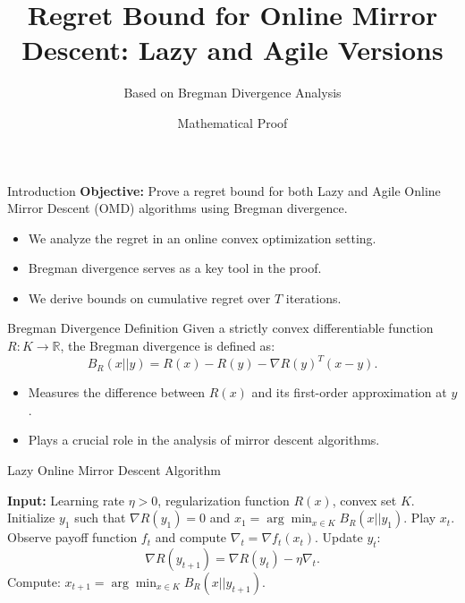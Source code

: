 \documentclass{beamer}
\title{Regret Bound for Online Mirror Descent: Lazy and Agile Versions}
\author{Based on Bregman Divergence Analysis}
\date{Mathematical Proof}
\begin{document}
\frame{\titlepage}

\begin{frame}{Introduction}
    \textbf{Objective:} Prove a regret bound for both Lazy and Agile Online Mirror Descent (OMD) algorithms using Bregman divergence.
    \begin{itemize}
        \item We analyze the regret in an online convex optimization setting.
        \item Bregman divergence serves as a key tool in the proof.
        \item We derive bounds on cumulative regret over $T$ iterations.
    \end{itemize}
\end{frame}

\begin{frame}{Bregman Divergence Definition}
    Given a strictly convex differentiable function $R: K \to \mathbb{R}$, the Bregman divergence is defined as:
    \begin{equation}
        B_R(x || y) = R(x) - R(y) - \nabla R(y)^T (x - y).
    \end{equation}
    \begin{itemize}
        \item Measures the difference between $R(x)$ and its first-order approximation at $y$.
        \item Plays a crucial role in the analysis of mirror descent algorithms.
    \end{itemize}
\end{frame}

\begin{frame}{Lazy Online Mirror Descent Algorithm}
    \begin{algorithm}[H]
        \caption{Lazy Online Mirror Descent}
        \begin{algorithmic}[1]
            \State \textbf{Input:} Learning rate $\eta > 0$, regularization function $R(x)$, convex set $K$.
            \State Initialize $y_1$ such that $\nabla R(y_1) = 0$ and $x_1 = \arg\min_{x \in K} B_R(x || y_1)$.
                \State Play $x_t$.
                \State Observe payoff function $f_t$ and compute $\nabla_t = \nabla f_t(x_t)$.
                \State Update $y_t$:
                \begin{equation}
                    \nabla R(y_{t+1}) = \nabla R(y_t) - \eta \nabla_t.
                \end{equation}
                \State Compute: $x_{t+1} = \arg\min_{x \in K} B_R(x || y_{t+1})$.
            \EndFor
        \end{algorithmic}
    \end{algorithm}
\end{frame}
\end{document}
